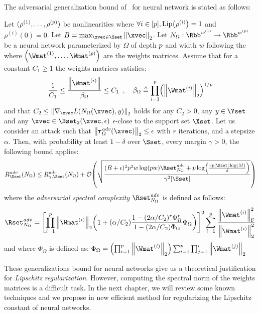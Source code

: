 The adversarial generalization bound of~\citet{farnia2018generalizable} for neural network is stated as follows:
\begin{theorem}
  Let $(\rho^{(1)}, \dots, \rho^{(p)})$ be nonlinearities where $\forall i \in [\depth], \lip{\rho^{(i)}} = 1$ and $\rho^{(i)}(0) = 0$.
  Let $B = \max_{\xvec \in \Sset} \norm{\xvec}_2$.
  Let $N_\Omega: \Rbb^{w^{(1)}} \rightarrow \Rbb^{w^{(\depth)}}$ be a neural network parameterized by $\Omega$ of depth $p$ and width $w$ following the~ where $\left( \Wmat^{(1)}, \dots, \Wmat^{(\depth)} \right)$ are the weights matrices.
  Assume that for a constant $C_1 \geq 1$ the weights matrices satisfies:
  \begin{equation}
    \frac{1}{C_1} \leq \frac{\norm{\Wmat^{(i)}}}{\beta_\Omega} \leq C_1 \enspace, \quad \beta_\Omega \triangleq \prod_{i=1}^\depth \left(\norm{\Wmat^{(i)}}_2\right)^{1/\depth}
  \end{equation}
  and that $C_2 \leq \norm{\nabla_\xvec L(N_\Omega(\xvec), y)}_2$ holds for any $C_2 > 0$, any $y \in \Yset$ and any $\xvec \in \Bset_2(\xvec, \epsilon)$ $\epsilon$-close to the support set $\Xset$.
  Let us consider an attack such that $\norm{\adv^{\text{\emph{adv}}}_\Omega(\xvec)}_2 \leq \epsilon$ with $r$ iterations, and a stepsize $\alpha$.
  Then, with probability at least $1 - \delta$ over $\Sset$, every margin $\gamma > 0$, the following bound applies:
  \begin{equation}
    R_\Dset^{\text{\emph{adv}}}(N_\Omega) \leq R_{\gamma, \Sset}^{\text{\emph{adv}}}(N_\Omega) + \bigO \left( \sqrt{\frac{(B + \epsilon)^2 \depth^2 w \log(\depth w) \Rset^{\text{\emph{adv}}}_{N_\Omega} + \depth \log(\frac{r \depth |\Sset| \log(M)}{\delta})}{\gamma^2 |\Sset|}} \right)
  \end{equation}
  where the \emph{adversarial spectral complexity} $\Rset^{\text{\emph{adv}}}_{N_\Omega}$ is defined as follows:
  \begin{equation}
    \Rset^{\text{\emph{adv}}}_{N_\Omega} = \left[ \prod_{i=1}^\depth \norm{\Wmat^{(i)}}_2 \left( 1 + (\alpha / C_2) \frac{1 - (2\alpha/C_2)^r \Phi_\Omega^r }{1 - (2\alpha/C_2) \Phi_\Omega } \Phi_\Omega  \right) \right]^2 \sum_{i = 1}^\depth \frac{\norm{\Wmat^{(i)}}_\fro^2}{\norm{\Wmat^{(i)}}_2^2}
  \end{equation}
  and where $\Phi_\Omega$ is defined as: $\Phi_\Omega = \left(\prod_{i=1}^\depth \norm{\Wmat^{(i)}}_2 \right) \sum_{i=1}^\depth \prod_{j=1}^{i} \norm{\Wmat^{(j)}}_2$
\end{theorem}

These generalizations bound for neural networks give us a theoretical justification for \emph{Lipschitz regularization}.
However, computing the spectral norm of the weights matrices is a difficult task.
In the next chapter, we will review some known techniques and we propose in  new efficient method for regularizing the Lipschitz constant of neural networks. 






